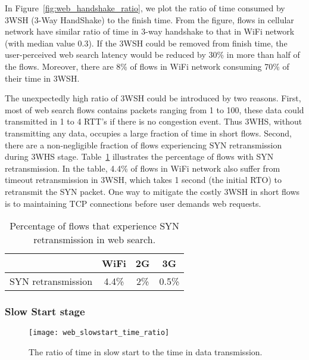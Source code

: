 In Figure~\ref{fig:web_handshake_ratio}, we plot the ratio of time consumed by 3WSH (3-Way HandShake) to the finish time. From the figure, flows in cellular network have similar ratio of time in 3-way handshake to that in WiFi network (with median value 0.3). If the 3WSH could be removed from finish time, the user-perceived web search latency would be reduced by 30\% in more than half of the flows. Moreover, there are 8\% of flows in WiFi network consuming 70\% of their time in 3WSH.

The unexpectedly high ratio of 3WSH could be introduced by two reasons. First, most of web search flows contains packets ranging from 1 to 100, these data could transmitted in 1 to 4 RTT's if there is no congestion event. Thus 3WHS, without transmitting any data, occupies a large fraction of time in short flows. Second, there are a non-negligible fraction of flows experiencing SYN retransmission during 3WHS stage. Table~\ref{tab:web_syn_retrans} illustrates the percentage of flows with SYN retransmission. In the table, 4.4\% of flows in WiFi network also suffer from timeout retransmission in 3WSH, which takes 1 second (\ie the initial RTO) to retransmit the SYN packet. One way to mitigate the costly 3WSH in short flows is to maintaining TCP connections before user demands web requests.

\begin{table}[th]
\centering
\renewcommand{\arraystretch}{1.1}
\caption{Percentage of flows that experience SYN retransmission in web search.}
\label{tab:web_syn_retrans}
\begin{tabular}{l|c|c|c}
\toprule
& WiFi & 2G & 3G \\
\midrule
SYN retransmission & 4.4\% & 2\% & 0.5\% \\
\bottomrule
\end{tabular}
\end{table}

\subsubsection{Slow Start stage}
\begin{figure}[th]
\centering
\texttt{[image: web\_slowstart\_time\_ratio]}
\caption{The ratio of time in slow start to the time in data transmission.}
\label{fig:web_ss_time_ratio}
\end{figure}

